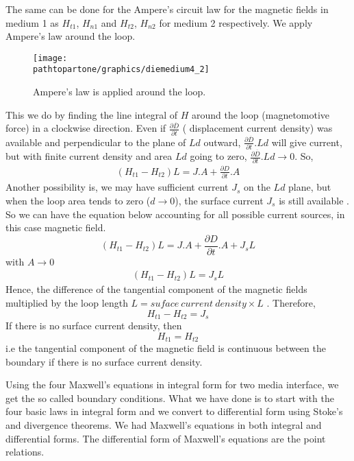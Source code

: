 The same can be done for the Ampere's circuit law for the magnetic fields in medium 1 as $H_{t1}$, $H_{n1}$ and $H_{t2}$, $H_{n2}$ for medium 2 respectively. We apply Ampere's law around the loop.
\begin{figure}[h]
\centering
\texttt{[image: \\pathtopartone/graphics/diemedium4\_2]}
\caption{Ampere's law is applied around the loop.}
\end{figure}
This we do by finding the line integral of $H$ around the loop (magnetomotive force) in a clockwise direction. Even if $\frac{\partial\overline{D}}{\partial t}$ ( displacement current density) was available and perpendicular to the plane of $Ld$ outward, $\frac{\partial\overline{D}}{\partial t}. Ld$ will give current, but with finite current density and area $Ld$ going to zero,  $\frac{\partial\overline{D}}{\partial t}. Ld \rightarrow 0 $. So,
\begin{align*}
(H_{t1} - H_{t2})L = J.A +\frac{\partial D}{\partial t}.A
\end{align*}
Another possibility is, we may have sufficient current $J_s$ on the $Ld$ plane, but when the loop area tends to zero ($d \rightarrow 0 $), the surface current $J_s$ is still available . So we can have the equation below accounting for all possible current sources, in this case magnetic field.
\begin{equation}
(H_{t1} - H_{t2})L = J.A +\frac{\partial D}{\partial t}.A + J_sL
\end{equation}
with $A \rightarrow 0$
\begin{align*}
(H_{t1} - H_{t2})L = J_sL
\end{align*}
Hence, the difference of the tangential component of the magnetic fields multiplied by the loop length $L = suface\ current\ density \times L$ . Therefore,
\begin{equation}
H_{t1} - H_{t2} = J_s
\end{equation}
If there is no surface current density, then 
\begin{equation}
H_{t1} = H_{t2}
\end{equation}
i.e the tangential component of the magnetic field is continuous between the boundary if there is no surface current density.

Using the four Maxwell's equations in integral form for two media interface, we get the so called boundary conditions. What we have done is to start with the four basic laws in integral form and we convert to differential form using Stoke's and divergence theorems. We had Maxwell's equations in both integral and differential forms. The differential form of Maxwell's equations are the point relations.

